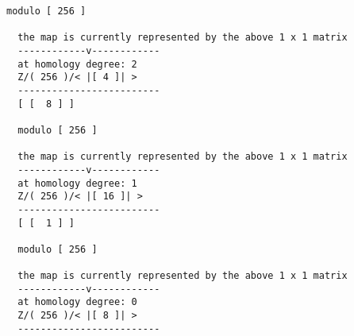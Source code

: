 \documentclass[a4paper,11pt]{report}
\begin{document}
{{{\begin{Verbatim}[fontsize=\small,frame=single,label=Example]
  modulo [ 256 ]
  
  the map is currently represented by the above 1 x 1 matrix
  ------------v------------
  at homology degree: 2
  Z/( 256 )/< |[ 4 ]| >
  -------------------------
  [ [  8 ] ]
  
  modulo [ 256 ]
  
  the map is currently represented by the above 1 x 1 matrix
  ------------v------------
  at homology degree: 1
  Z/( 256 )/< |[ 16 ]| >
  -------------------------
  [ [  1 ] ]
  
  modulo [ 256 ]
  
  the map is currently represented by the above 1 x 1 matrix
  ------------v------------
  at homology degree: 0
  Z/( 256 )/< |[ 8 ]| >
  -------------------------
\end{Verbatim}
 }

 }

  }

   
\end{document}
